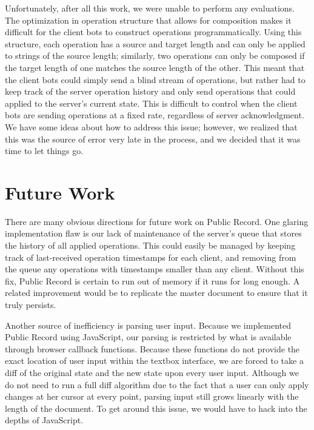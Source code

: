 \documentclass[letterpaper,11pt,twocolumn]{article}
\begin{document}
Unfortunately, after all this work, we were unable to perform any evaluations.  The optimization in operation structure that allows for composition makes it difficult for the client bots to construct operations programmatically.  Using this structure, each operation has a source and target length and can only be applied to strings of the source length; similarly, two operations can only be composed if the target length of one matches the source length of the other.  This meant that the client bots could simply send a blind stream of operations, but rather had to keep track of the server operation history and only send operations that could applied to the server's current state.  This is difficult to control when the client bots are sending operations at a fixed rate, regardless of server acknowledgment.  We have some ideas about how to address this issue; however, we realized that this was the source of error very late in the process, and we decided that it was time to let things go.

\section{Future Work} \label{sec:future}

There are many obvious directions for future work on Public Record.  One glaring implementation flaw is our lack of maintenance of the server's queue that stores the history of all applied operations.  This could easily be managed by keeping track of last-received operation timestamps for each client, and removing from the queue any operations with timestamps smaller than any client.  Without this fix, Public Record is certain to run out of memory if it runs for long enough.  A related improvement would be to replicate the master document to ensure that it truly persists.  

Another source of inefficiency is parsing user input.  Because we implemented Public Record using JavaScript, our parsing is restricted by what is available through browser callback functions.  Because these functions do not provide the exact location of user input within the textbox interface, we are forced to take a diff of the original state and the new state upon every user input.  Although we do not need to run a full diff algorithm due to the fact that a user can only apply changes at her cursor at every point, parsing input still grows linearly with the length of the document.  To get around this issue, we would have to hack into the depths of JavaScript.
\end{document}
